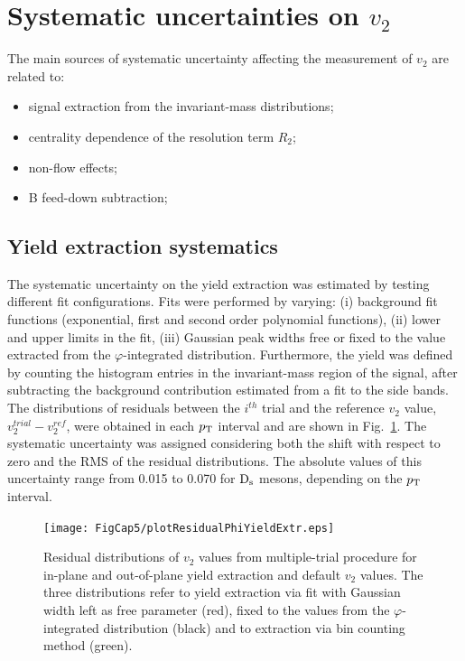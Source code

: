 \section{Systematic uncertainties on $v_2$}
\label{sec:systsectionV2}
The main sources of systematic uncertainty affecting the measurement of 
$v_2$ are related to: 
\begin{itemize}
\item signal extraction from the invariant-mass
distributions;
\item centrality dependence of the resolution term $R_2$;
\item non-flow effects;
\item B feed-down subtraction;
\end{itemize}

\subsection{Yield extraction systematics}
\label{sec:rawYv2}
The systematic uncertainty on the yield extraction was 
estimated by testing different fit configurations.
Fits were performed by varying: (i) background fit functions
(exponential, first and second order polynomial functions), 
(ii) lower and upper limits in the fit, (iii) Gaussian peak widths free or fixed to the value
extracted from the $\varphi$-integrated distribution. Furthermore, the yield was defined by
counting the histogram entries in the invariant-mass region of the signal, after subtracting the background
contribution estimated from a fit to the side bands. The distributions of
residuals between the $i^{th}$ trial and the reference $v_2$ value, 
$v_2^{trial}-v_2^{ref}$, were obtained in each $p_{\rm T}$ interval and are shown in Fig.~\ref{fig:residualsV2}. 
The systematic uncertainty was assigned
considering both the shift with respect to zero and the RMS of the residual
distributions. The absolute values of this uncertainty range from 
0.015 to 0.070 for ${\rm D_s}$ mesons, depending on the $p_{\rm T}$ interval.
\begin{figure}
\centering
  \texttt{[image: FigCap5/plotResidualPhiYieldExtr.eps]}
\caption{Residual distributions of $v_2$ values from multiple-trial procedure for in-plane and out-of-plane yield extraction and default $v_2$ values. The three distributions refer to yield extraction via fit with Gaussian width left as free parameter (red), fixed to the values from the $\varphi$-integrated distribution (black) and to extraction via bin counting method (green).}
\label{fig:residualsV2}
\end{figure}

